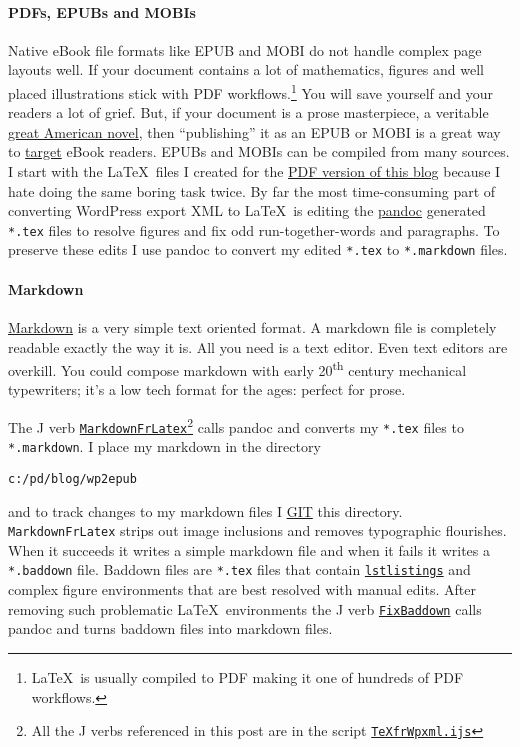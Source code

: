 \paragraph{PDFs, EPUBs and MOBIs}

Native eBook file formats like EPUB and MOBI do not handle complex page
layouts well. If your document contains a lot of mathematics, figures
and well placed illustrations stick with PDF
workflows.\footnote{
\LaTeX\ is usually compiled to PDF making it one
of hundreds of PDF workflows.
} You will save yourself and your readers a
lot of grief. But, if your document is a prose masterpiece, a veritable
\href{http://www.thedailybeast.com/newsweek/2010/02/04/is-the-great-american-novel-destroying-novelists.html}{great
American novel}, then ``publishing'' it as an EPUB or MOBI is a great way
to
\href{http://www.counterpunch.org/2011/01/20/in-praise-of-incivility-in-politics/}{target}
eBook readers. EPUBs and MOBIs can be compiled from many sources. I
start with the \LaTeX\ files I created for the
\href{http://www.box.com/s/8yvm27ag9agtm32nfahd}{PDF version of this
blog} because I hate doing the same boring task twice. By far the most
time-consuming part of converting WordPress export XML to \LaTeX\ is
editing the \href{http://johnmacfarlane.net/pandoc/}{pandoc} generated
\texttt{*.tex} files to resolve figures and fix odd run-together-words
and paragraphs. To preserve these edits I use pandoc to convert my
edited \texttt{*.tex} to \texttt{*.markdown} files.

\paragraph{Markdown}

\href{http://daringfireball.net/projects/markdown/}{Markdown} is a very
simple text oriented format. A markdown file is completely readable
exactly the way it is. All you need is a text editor. Even text editors
are overkill. You could compose markdown with early 20\textsuperscript{th} century
mechanical typewriters; it's a low tech format for the ages: perfect for
prose.

The J verb \href{http://www.box.com/s/1k418f2y706ihlxnat4e}{\texttt{MarkdownFrLatex}}\footnote{
All the J verbs referenced in this post are in
the script \href{http://www.box.com/s/9v5b6ub9cya108c03mr7}{\texttt{TeXfrWpxml.ijs}}
} calls pandoc
and converts my \texttt{*.tex} files to \texttt{*.markdown}. I place my
markdown in the directory
\begin{verbatim}
c:/pd/blog/wp2epub
\end{verbatim}
and to track changes to my markdown files I
\href{http://git-scm.com/}{GIT} this directory. \texttt{MarkdownFrLatex}
strips out image inclusions and removes typographic flourishes. When it
succeeds it writes a simple markdown file and when it fails it writes a
\texttt{*.baddown} file. Baddown files are \texttt{*.tex} files that
contain
\href{http://en.wikibooks.org/wiki/LaTeX/Packages/Listings}{\texttt{lstlistings}} and
complex figure environments that are best resolved with manual edits.
After removing such problematic \LaTeX\ environments the J verb
\href{http://www.box.com/s/sxmgq2copxot4ahnbzso}{\texttt{FixBaddown}} calls pandoc and turns baddown files into markdown
files.

